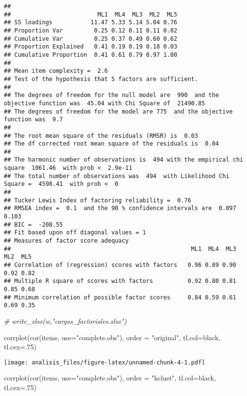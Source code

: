 \documentclass[
]{article}
\newenvironment{Shaded}{\begin{snugshade}}{\end{snugshade}}
\newcommand{\AttributeTok}[1]{\textcolor[rgb]{0.77,0.63,0.00}{#1}}
\newcommand{\CommentTok}[1]{\textcolor[rgb]{0.56,0.35,0.01}{\textit{#1}}}
\newcommand{\DecValTok}[1]{\textcolor[rgb]{0.00,0.00,0.81}{#1}}
\newcommand{\FunctionTok}[1]{\textcolor[rgb]{0.00,0.00,0.00}{#1}}
\newcommand{\NormalTok}[1]{#1}
\newcommand{\StringTok}[1]{\textcolor[rgb]{0.31,0.60,0.02}{#1}}
\begin{document}
\begin{verbatim}
## 
##                         ML1  ML4  ML3  ML2  ML5
## SS loadings           11.47 5.33 5.14 5.04 0.76
## Proportion Var         0.25 0.12 0.11 0.11 0.02
## Cumulative Var         0.25 0.37 0.49 0.60 0.62
## Proportion Explained   0.41 0.19 0.19 0.18 0.03
## Cumulative Proportion  0.41 0.61 0.79 0.97 1.00
## 
## Mean item complexity =  2.6
## Test of the hypothesis that 5 factors are sufficient.
## 
## The degrees of freedom for the null model are  990  and the objective function was  45.04 with Chi Square of  21490.85
## The degrees of freedom for the model are 775  and the objective function was  9.7 
## 
## The root mean square of the residuals (RMSR) is  0.03 
## The df corrected root mean square of the residuals is  0.04 
## 
## The harmonic number of observations is  494 with the empirical chi square  1061.46  with prob <  2.9e-11 
## The total number of observations was  494  with Likelihood Chi Square =  4598.41  with prob <  0 
## 
## Tucker Lewis Index of factoring reliability =  0.76
## RMSEA index =  0.1  and the 90 % confidence intervals are  0.097 0.103
## BIC =  -208.55
## Fit based upon off diagonal values = 1
## Measures of factor score adequacy             
##                                                    ML1  ML4  ML3  ML2  ML5
## Correlation of (regression) scores with factors   0.96 0.89 0.90 0.92 0.82
## Multiple R square of scores with factors          0.92 0.80 0.81 0.85 0.68
## Minimum correlation of possible factor scores     0.84 0.59 0.61 0.69 0.35
\end{verbatim}

\begin{Shaded}
\begin{Highlighting}[]
\CommentTok{\# write\_xlsx(w,"cargas\_factoriales.xlsx")}


\FunctionTok{corrplot}\NormalTok{(}\FunctionTok{cor}\NormalTok{(items, }\AttributeTok{use=}\StringTok{"complete.obs"}\NormalTok{), }\AttributeTok{order =} \StringTok{"original"}\NormalTok{, }\AttributeTok{tl.col=}\StringTok{\textquotesingle{}black\textquotesingle{}}\NormalTok{, }\AttributeTok{tl.cex=}\NormalTok{.}\DecValTok{75}\NormalTok{) }
\end{Highlighting}
\end{Shaded}

\texttt{[image: analisis\_files/figure-latex/unnamed-chunk-4-1.pdf]}

\begin{Shaded}
\begin{Highlighting}[]
\FunctionTok{corrplot}\NormalTok{(}\FunctionTok{cor}\NormalTok{(items, }\AttributeTok{use=}\StringTok{"complete.obs"}\NormalTok{), }\AttributeTok{order =} \StringTok{"hclust"}\NormalTok{, }\AttributeTok{tl.col=}\StringTok{\textquotesingle{}black\textquotesingle{}}\NormalTok{, }\AttributeTok{tl.cex=}\NormalTok{.}\DecValTok{75}\NormalTok{) }
\end{Highlighting}
\end{Shaded}
\end{document}
